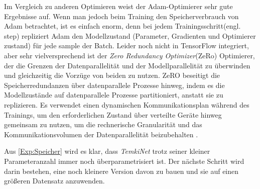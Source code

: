 \documentclass[12pt,a4paper]{scrartcl}
\numberwithin{equation}{section}
\begin{document}
Im Vergleich zu anderen Optimieren weist der Adam-Optimierer sehr gute Ergebnisse auf. Wenn man jedoch beim Training den Speicherverbrauch von Adam betrachtet, ist es einfach enorm, denn bei jedem Trainingsschritt(engl. step) repliziert Adam den Modellzustand (Parameter, Gradienten und Optimierer zustand) für jede sample der Batch.
Leider noch nicht in TensorFlow integriert, aber sehr vielversprechend ist der \textit{Zero Redundancy Optimizer}(ZeRo) Optimierer, der die Grenzen der Datenparallelität und der Modellparallelität zu überwinden und gleichzeitig die Vorzüge von beiden zu nutzen. ZeRO beseitigt die Speicherredundanzen über datenparallele Prozesse hinweg, indem es die Modellzustände auf datenparallele Prozesse partitioniert, anstatt sie zu replizieren. Es verwendet einen dynamischen Kommunikationsplan während des Trainings, um den erforderlichen Zustand über verteilte Geräte hinweg gemeinsam zu nutzen, um die rechnerische Granularität und das Kommunikationsvolumen der Datenparallelität beizubehalten \cite{ZeRo}.

Aus \ref{Exp:Speicher} wird es klar, dass \textit{TemkiNet}  trotz seiner kleiner Parameteranzahl immer noch überparametrisiert ist. Der nächste Schritt wird darin bestehen, eine noch kleinere Version davon zu bauen und sie auf einen größeren Datensatz anzuwenden.

\newpage

\end{document}
